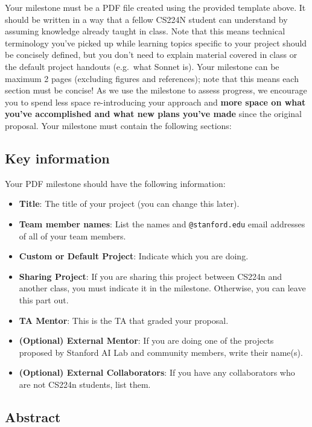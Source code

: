 \documentclass[11pt,a4paper]{article}
\begin{document}
Your milestone must be a PDF file created using the provided template above. It should be written in a way that a fellow CS224N student can understand by assuming knowledge already taught in class. Note that this means technical terminology you've picked up while learning topics specific to your project should be concisely defined, but you don't need to explain material covered in class or the default project handouts (e.g.\ what Sonnet is). Your milestone can be maximum 2 pages (excluding figures and references); note that this means each section must be concise! As we use the milestone to assess progress, we encourage you to spend less space re-introducing your approach and \textbf{more space on what you've accomplished and what new plans you've made} since the original proposal. Your milestone must contain the following sections:

\subsection*{Key information}

Your PDF milestone should have the following information:

\begin{itemize}[nosep]
    \item \textbf{Title}: The title of your project (you can change this later).
    \item \textbf{Team member names}: List the names and \texttt{@stanford.edu} email addresses of all of your team members.
    \item \textbf{Custom or Default Project}: Indicate which you are doing.
    \item \textbf{Sharing Project}: If you are sharing this project between CS224n and another class, you must indicate it in the milestone. Otherwise, you can leave this part out.
    \item \textbf{TA Mentor}: This is the TA that graded your proposal.
    \item \textbf{(Optional) External Mentor}: If you are doing one of the projects proposed by Stanford AI Lab and community members, write their name(s).
    \item \textbf{(Optional) External Collaborators}: If you have any collaborators who are not CS224n students, list them.
\end{itemize}

\subsection*{Abstract}
\end{document}
